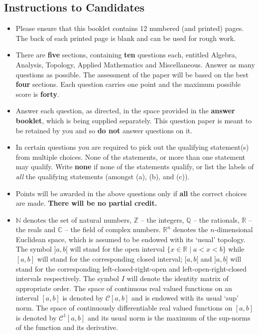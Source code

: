 \documentclass[11pt,a4paper]{article}
\newcommand{\N}{\mathbb{N}}
\newcommand{\Z}{\mathbb{Z}}
\newcommand{\Q}{\mathbb{Q}}
\newcommand{\R}{\mathbb{R}}
\newcommand{\C}{\mathbb{C}}
\begin{document}
\subsection*{Instructions to Candidates}
\begin{itemize}
  \item Please ensure that this booklet contains 12 numbered (and printed) pages. The back of each printed page is blank and can be used for rough work.
  \item There are \textbf{five} sections, containing \textbf{ten} questions each, entitled Algebra, Analysis, Topology, Applied Mathematics and Miscellaneous. Answer as many questions as possible. The assessment of the paper will be based on the best \textbf{four} sections. Each question carries one point and the maximum possible score is \textbf{forty}.
  \item Answer each question, as directed, in the space provided in the \textbf{answer booklet}, which is being supplied separately. This question paper is meant to be retained by you and so \textbf{do not} answer questions on it.
  \item In certain questions you are required to pick out the qualifying statement(s) from multiple choices. None of the statements, or more than one statement may qualify. Write \textbf{none} if none of the statements qualify, or list the labels of \emph{all} the qualifying statements (amongst (a), (b), and (c)).
  \item Points will be awarded in the above questions only if \textbf{all} the correct choices are made. \textbf{There will be no partial credit.}
  \item $\N$ denotes the set of natural numbers, $\Z$ -- the integers, $\Q$ -- the rationals, $\R$ -- the reals and $\C$ -- the field of complex numbers. $\R^n$ denotes the $n$-dimensional Euclidean space, which is assumed to be endowed with its `usual' topology. The symbol $]a, b[$ will stand for the open interval $\{x \in \R \mid a < x < b\}$ while $[a, b]$ will stand for the corresponding closed interval; $[a, b[$ and $]a, b]$ will stand for the corresponding left-closed-right-open and left-open-right-closed intervals respectively. The symbol $I$ will denote the identity matrix of appropriate order. The space of continuous real valued functions on an interval $[a, b]$ is denoted by $\mathcal{C}[a, b]$ and is endowed with its usual `sup' norm. The space of continuously differentiable real valued functions on $[a, b]$ is denoted by $\mathcal{C}^1[a, b]$ and its usual norm is the maximum of the sup-norms of the function and its derivative.
\end{itemize}
\end{document}
